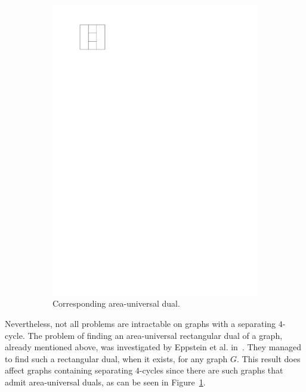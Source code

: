 \begin{figure}
\begin{subfigure}[t]{3cm}
        \includegraphics[scale=1]{introduction/img/areaunivDual.pdf}
        \caption{Corresponding area-universal dual.}
      \end{subfigure}
    \caption{}
    \label{fig:intro:areauniv}
  \end{figure}

  Nevertheless, not all problems are intractable on graphs with a separating $4$-cycle.
  The problem of finding an area-universal rectangular dual of a graph, already mentioned above, was investigated by Eppstein et al.  in~\cite{Eppstein2012}.
  They managed to find such a rectangular dual, when it exists, for any graph $G$.
  This result does affect graphs containing separating $4$-cycles since there are such graphs that admit area-universal duals, as can be seen in Figure~\ref{fig:intro:areauniv}.


